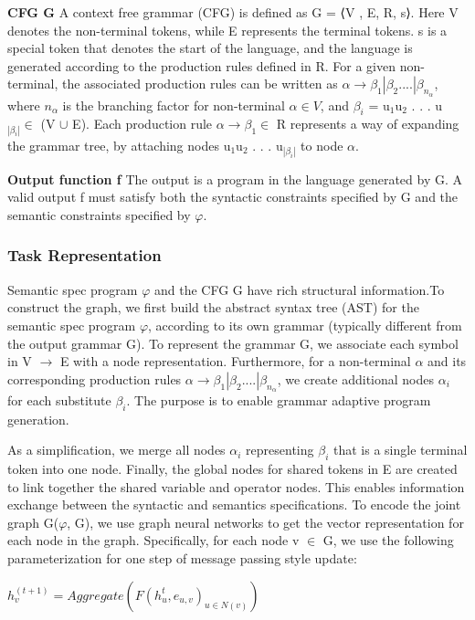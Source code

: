 \documentclass{article}
\begin{document}
\textbf{CFG G} A context free grammar (CFG) is defined as G = ⟨V , E, R, s⟩. Here V denotes the non-terminal tokens, while E represents the terminal tokens. s is a special token that denotes the start of the language, and the language is generated according to the production rules defined in R. For a given non-terminal, the associated production rules can be written as $\alpha \rightarrow \beta_1 | \beta_2 .... | \beta_{n_\alpha}$, where ${n_\alpha}$ is the branching factor for non-terminal $\alpha \in V$, and $\beta _i$ = u$_1$u$_2$ . . . u$_{|\beta_i|} \in$  (V $\cup$ E). Each production rule $\alpha \rightarrow \beta_1 \in$ R represents a way of expanding the grammar tree, by attaching nodes u$_1$u$_2$ . . . u$_{|\beta_i|}$ to node $\alpha$.

\textbf{Output function f} The output is a program in the language generated by G. A valid output f must satisfy both the syntactic constraints specified by G and the semantic constraints specified by $\varphi$.
\subsubsection{Task Representation}
Semantic spec program $\varphi$ and the CFG G have rich structural information.To construct the graph, we first build the abstract syntax tree (AST) for the semantic spec program $\varphi$, according to its own grammar (typically different from the output grammar G). To represent the grammar G, we associate each symbol in V $\rightarrow$ E with a node representation. Furthermore, for a non-terminal $\alpha$ and its corresponding production rules  $\alpha \rightarrow \beta_1 | \beta_2 .... | \beta_{n_\alpha}$, we create additional nodes $\alpha_i$ for each substitute $\beta_i$. The purpose is to enable grammar adaptive program generation.

As a simplification, we merge all nodes $\alpha_i$ representing $\beta_i$ that is a single terminal token into one node. Finally, the global nodes for shared tokens in E are created to link together the shared variable and operator nodes. This enables information exchange between the syntactic and semantics specifications. To encode the joint graph G($\varphi$, G), we use graph neural networks to get the vector representation for each node in the graph. Specifically, for each node v $\in$ G, we use the following parameterization for one step of message passing style update:

\begin{math}
h^{(t+1)}_v = Aggregate({F(h^t_u , e_{u,v} )}_{u \in N(v)})
\end{math}
\end{document}
